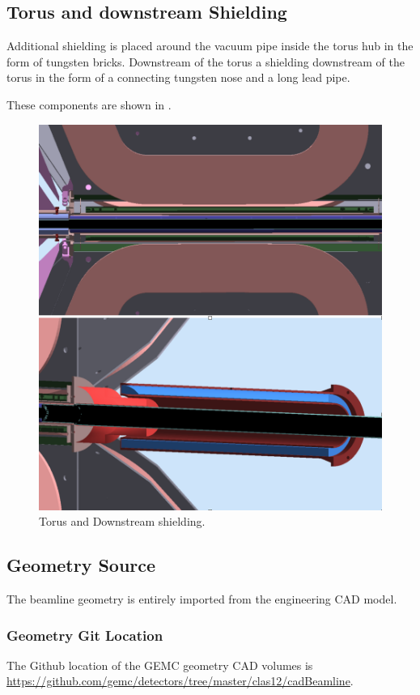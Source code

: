 \subsection{Torus and downstream Shielding}
Additional shielding is placed around the vacuum pipe inside the torus hub in the form of tungsten bricks.
Downstream of the torus a shielding downstream of the torus in the form of a connecting tungsten nose and a long lead pipe.

These components are shown in .

\begin{figure}
	\centering
	\includegraphics[width=0.98\columnwidth,keepaspectratio]{img/downstreamShielding.png}
   \caption{Torus and Downstream shielding.}
	\label{fig:downstreamShielding}
\end{figure}



\subsection{Geometry Source}

The beamline geometry is entirely imported from the engineering CAD model.

\subsubsection{Geometry Git Location}

The Github location of the GEMC geometry CAD volumes is \url{https://github.com/gemc/detectors/tree/master/clas12/cadBeamline}.
